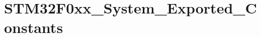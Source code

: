 \hypertarget{group___s_t_m32_f0xx___system___exported___constants}{}\section{S\+T\+M32\+F0xx\+\_\+\+System\+\_\+\+Exported\+\_\+\+Constants}
\label{group___s_t_m32_f0xx___system___exported___constants}
